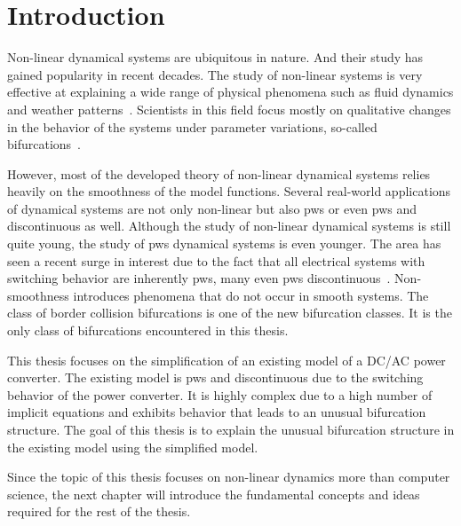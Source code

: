 \chapter{Introduction}
\label{chap:intro}

Non-linear dynamical systems are ubiquitous in nature.
And their study has gained popularity in recent decades.
The study of non-linear systems is very effective at explaining a wide range of physical phenomena such as fluid dynamics and weather patterns~\cite{bernardo2008piecewise}.
Scientists in this field focus mostly on qualitative changes in the behavior of the systems under parameter variations, so-called bifurcations~\cite{simpson2010}.

However, most of the developed theory of non-linear dynamical systems relies heavily on the smoothness of the model functions.
Several real-world applications of dynamical systems are not only non-linear but also \gls{pws} or even \gls{pws} and discontinuous as well.
Although the study of non-linear dynamical systems is still quite young, the study of \gls{pws} dynamical systems is even younger.
The area has seen a recent surge in interest due to the fact that all electrical systems with switching behavior are inherently \gls{pws}, many even \gls{pws} discontinuous~\cite{simpson2010}.
Non-smoothness introduces phenomena that do not occur in smooth systems.
The class of border collision bifurcations is one of the new bifurcation classes.
It is the only class of bifurcations encountered in this thesis.

This thesis focuses on the simplification of an existing model of a DC/AC power converter.
The existing model is \gls{pws} and discontinuous due to the switching behavior of the power converter.
It is highly complex due to a high number of implicit equations and exhibits behavior that leads to an unusual bifurcation structure.
The goal of this thesis is to explain the unusual bifurcation structure in the existing model using the simplified model.

Since the topic of this thesis focuses on non-linear dynamics more than computer science, the next chapter will introduce the fundamental concepts and ideas required for the rest of the thesis.

